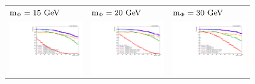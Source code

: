 \begin{figure}[htb!]
	\centering
	\begin{tabular}{>{\centering\arraybackslash}m{0.32\linewidth} >{\centering\arraybackslash}m{0.32\linewidth} >{\centering\arraybackslash}m{0.32\linewidth}}
		$\mphi=15\unit{GeV}$ & $\mphi=20\unit{GeV}$ & $\mphi=30\unit{GeV}$ \\
		\includegraphics[width=\linewidth]{figs/05_analysis/cutBasedID_effVsLxy_Z_m15_cats_2018.pdf} &
		\includegraphics[width=\linewidth]{figs/05_analysis/cutBasedID_effVsLxy_Z_m20_cats_2018.pdf} &
		\includegraphics[width=\linewidth]{figs/05_analysis/cutBasedID_effVsLxy_Z_m30_cats_2018.pdf} \\

\end{tabular}
\end{figure}
